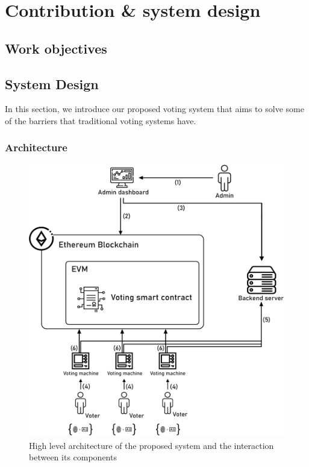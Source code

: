 \chapter{Contribution \& system design}
\section{Work objectives}
\section{System Design}

In this section, we introduce our proposed voting system that aims to solve some of the barriers that traditional voting systems have.

\subsection{Architecture}

\begin{figure}[H]
	\centering
		\includegraphics[width=12cm]{images/chapter3/architecture.png}
		\caption{{\footnotesize High level architecture of the proposed system and the interaction between its components}}
\end{figure}

